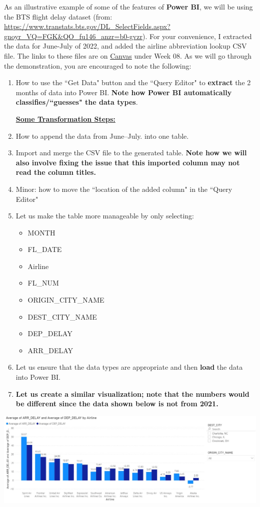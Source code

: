 \documentclass[letterpaper,addpoints, 11pt]{exam}
\begin{document}
\begin{questions}

\question[0] As an illustrative example of some of the features of \textbf{Power BI}, we will be using the BTS flight delay dataset (from: \url{https://www.transtats.bts.gov/DL_SelectFields.aspx?gnoyr_VQ=FGK&QO_fu146_anzr=b0-gvzr}). For your convenience, I extracted the data for June-July of 2022, and  added the airline abbreviation lookup CSV file. The links to these files are on \underline{Canvas} under Week 08. As we will go through the demonstration, you are encouraged to note the following: 
\begin{enumerate}[label=(\Alph*)]
	\item How to use the ``Get Data" button and the ``Query Editor" to \textbf{extract} the 2 months of data into Power BI. \textbf{Note how Power BI automatically classifies/``guesses" the data types}.\\
	\bigskip \bigskip \bigskip \bigskip
	
	\noindent \underline{\textbf{Some Transformation Steps:}}
	\item How to append the data from June--July. into one table.
	\bigskip \bigskip \bigskip  
	\item Import and merge the CSV file to the generated table. \textbf{Note how we will also involve fixing the issue that this imported column may not read the column titles.}
	\bigskip \bigskip
	\item Minor: how to move the ``location of the added column" in the ``Query Editor"
	\bigskip
	\item Let us make the table more manageable by only selecting: 
	\begin{itemize}[nosep]
		\item MONTH
		\item FL\_DATE
		\item Airline
		\item FL\_NUM
		\item ORIGIN\_CITY\_NAME
		\item DEST\_CITY\_NAME
		\item DEP\_DELAY 
		\item ARR\_DELAY
	\end{itemize}
	\item Let us ensure that the data types are appropriate and then \textbf{load} the data into Power BI.
	\bigskip \bigskip
	\item \textbf{Let us create a similar visualization; note that the numbers would be different since the data shown below is not from 2021.}	
\end{enumerate}
 	
{\centering \includegraphics[width=\textwidth,frame]{figures/powerbi}}

\vspace{0.25in}



\end{questions}
\end{document}
